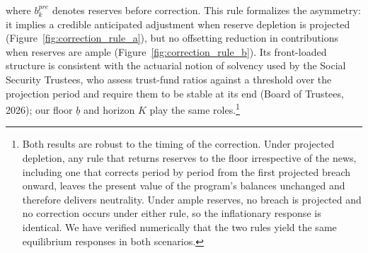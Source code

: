 \documentclass[12pt]{article}%
\theoremstyle{remark}
\begin{document}
where $b^{pre}_k$ denotes reserves before correction. This rule formalizes the asymmetry: it implies a credible anticipated adjustment when reserve depletion is projected (Figure~\ref{fig:correction_rule_a}), but no offsetting reduction in contributions when reserves are ample (Figure~\ref{fig:correction_rule_b}). Its front-loaded structure is consistent with the actuarial notion of solvency used by the Social Security Trustees, who assess trust-fund ratios against a threshold over the projection period and require them to be stable at its end (Board of Trustees, 2026); our floor $\underline{b}$ and horizon $K$ play the same roles.\footnote{Both results are robust to the timing of the correction. Under projected depletion, any rule that returns reserves to the floor irrespective of the news, including one that corrects period by period from the first projected breach onward, leaves the present value of the program's balances unchanged and therefore delivers neutrality. Under ample reserves, no breach is projected and no correction occurs under either rule, so the inflationary response is identical. We have verified numerically that the two rules yield the same equilibrium responses in both scenarios.}
\end{document}
